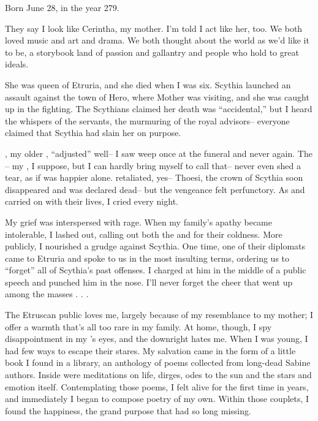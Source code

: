 \documentclass[char]{Kos}
\begin{document}
\name{\cPoet{}}

Born June 28, in the year 279.

They say I look like Cerintha, my mother. I'm told I act like her, too. We both loved music and art and drama. We both thought about the world as we'd like it to be, a storybook land of passion and gallantry and people who hold to great ideals. 

She was queen of Etruria, and she died when I was six. Scythia launched an assault against the town of Hero, where Mother was visiting, and she was caught up in the fighting. The Scythians claimed her death was ``accidental,'' but I heard the whispers of the servants, the murmuring of the royal advisors-- everyone claimed that Scythia had slain her on purpose. 

\cGroom{}, my older \cGroom{\sibling}, ``adjusted'' well-- I saw \cGroom{\them} weep once at the funeral and never again. The \cEtruriaKing{\monarch}-- my \cEtruriaKing{\parent}, I suppose, but I can hardly bring myself to call \cEtruriaKing{\them} that-- never even shed a tear, as if \cEtruriaKing{\they} was happier alone. \cEtruriaKing{\They} retaliated, yes-- Thoesi, the crown \cFugitive{\prince} of Scythia soon disappeared and was declared dead-- but the vengeance felt perfunctory. As \cEtruriaKing{\they} and \cGroom{} carried on with their lives, I cried every night.

My grief was interspersed with rage. When my family's apathy became intolerable, I lashed out, calling out both the \cEtruriaKing{\monarch} and \cGroom{} for their coldness. More publicly, I nourished a grudge against Scythia. One time, one of their diplomats came to Etruria and spoke to us in the most insulting terms, ordering us to ``forget'' all of Scythia's past offenses. I charged at him in the middle of a public speech and punched him in the nose. I'll never forget the cheer that went up among the masses . . .

The Etruscan public loves me, largely because of my resemblance to my mother; I offer a warmth that's all too rare in my family. At home, though, I spy disappointment in my \cGroom{\sibling}'s eyes, and the \cEtruriaKing{\monarch} downright hates me. When I was young, I had few ways to escape their stares. My salvation came in the form of a little book I found in a library, an anthology of poems collected from long-dead Sabine authors. Inside were meditations on life, dirges, odes to the sun and the stars and emotion itself. Contemplating those poems, I felt alive for the first time in years, and immediately I began to compose poetry of my own. Within those couplets, I found the happiness, the grand purpose that had so long missing.
\end{document}
